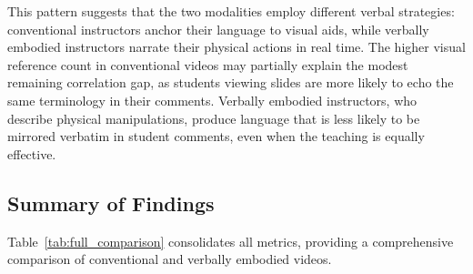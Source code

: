 This pattern suggests that the two modalities employ different verbal strategies: conventional instructors anchor their language to visual aids, while verbally embodied instructors narrate their physical actions in real time. The higher visual reference count in conventional videos may partially explain the modest remaining correlation gap, as students viewing slides are more likely to echo the same terminology in their comments. Verbally embodied instructors, who describe physical manipulations, produce language that is less likely to be mirrored verbatim in student comments, even when the teaching is equally effective.


\subsection{Summary of Findings}

Table~\ref{tab:full_comparison} consolidates all metrics, providing a comprehensive comparison of conventional and verbally embodied videos.

